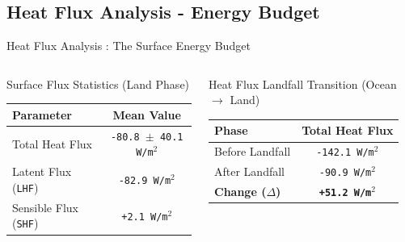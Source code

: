 \documentclass[8pt, aspectratio=169]{beamer}
\begin{document}
\subsection{Heat Flux Analysis - Energy Budget}
\begin{frame}[label=budget]{Heat Flux Analysis : The Surface Energy Budget}
    \begin{columns}[T]
        \footnotesize
        \begin{block}{Surface Flux Statistics (Land Phase)}
            \centering
            \begin{tabular}{lc}
                \toprule
                \textbf{Parameter} & \textbf{Mean Value}\footnotemark[6] \\
                \midrule
                Total Heat Flux & \texttt{-80.8 $\pm$ 40.1 W/m$^2$} \\
                Latent Flux (\texttt{LHF}) & \texttt{-82.9 W/m$^2$} \\
                Sensible Flux (\texttt{SHF}) & \texttt{+2.1 W/m$^2$} \\
                \bottomrule
            \end{tabular}
        \end{block}

        \footnotesize
        \begin{block}{Heat Flux Landfall Transition (Ocean $\rightarrow$ Land)}
            \centering
            \begin{tabular}{lc}
                \toprule
                \textbf{Phase} & \textbf{Total Heat Flux} \\
                \midrule
                Before Landfall & \texttt{-142.1 W/m$^2$} \\
                After Landfall & \texttt{-90.9 W/m$^2$} \\
                \textbf{Change ($\Delta$)} & \textbf{\texttt{+51.2 W/m$^2$}} \\
                \bottomrule
            \end{tabular}
        \end{block}
    \end{columns}


\end{frame}
\end{document}
